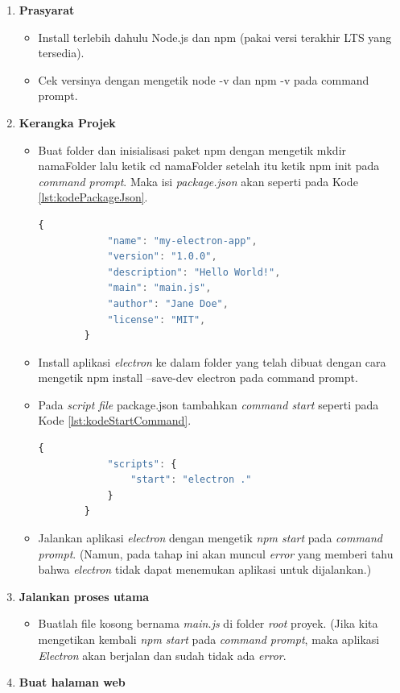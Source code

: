 \begin{enumerate}
    \item \textbf{Prasyarat}
    \begin{itemize}
        \item Install terlebih dahulu Node.js dan npm (pakai versi terakhir LTS yang tersedia).
        \item Cek versinya dengan mengetik node -v dan npm -v pada command prompt.
    \end{itemize}
    \item \textbf{Kerangka Projek}
    \begin{itemize}
        \item Buat folder dan inisialisasi paket npm dengan mengetik mkdir namaFolder lalu ketik cd namaFolder setelah itu ketik npm init pada \textit{command prompt}. Maka isi \textit{package.json} akan seperti pada Kode \ref{lst:kodePackageJson}.
    
        \begin{lstlisting}[language=JavaScript, caption=Package.json\label{lst:kodePackageJson}]
        {
            "name": "my-electron-app",
            "version": "1.0.0",
            "description": "Hello World!",
            "main": "main.js",
            "author": "Jane Doe",
            "license": "MIT",
        }
        \end{lstlisting}
        \item Install aplikasi \textit{electron} ke dalam folder yang telah dibuat dengan cara mengetik npm install --save-dev electron pada command prompt.
        \item Pada \textit{script file} package.json tambahkan \textit{command start} seperti pada Kode \ref{lst:kodeStartCommand}.
        
        \begin{lstlisting}[language=JavaScript, caption=\textit{Start command}\label{lst:kodeStartCommand}]
        {
            "scripts": {
                "start": "electron ."
            }
        }
        \end{lstlisting}
        \item Jalankan aplikasi \textit{electron} dengan mengetik \textit{npm start} pada \textit{command prompt}.
        (Namun, pada tahap ini akan muncul \textit{error} yang memberi tahu bahwa \textit{electron} tidak dapat menemukan aplikasi untuk dijalankan.)
    \end{itemize}
    \item \textbf{Jalankan proses utama}
    \begin{itemize}
        \item Buatlah file kosong bernama \textit{main.js} di folder \textit{root} proyek. (Jika kita mengetikan kembali \textit{npm start} pada \textit{command prompt}, maka aplikasi \textit{Electron} akan berjalan dan sudah tidak ada \textit{error}.
    \end{itemize}
    \item \textbf{Buat halaman web}
    

\end{enumerate}
